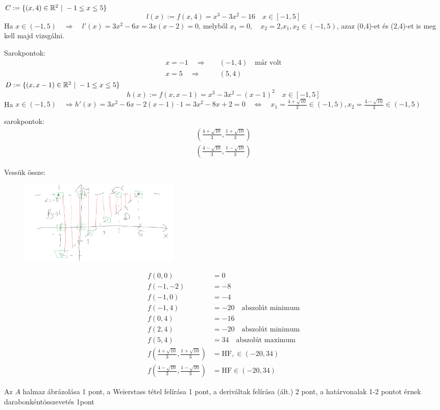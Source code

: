 \documentclass[a4paper,11.5pt]{article}
\begin{document}
\begin{task}
		$C:=\{ (x,4)\in\mathbb{R}^2\ | \ -1\leq x\leq 5 \}$
		\[ l(x):=f(x,4)=x^3-3x^2-16\quad x\in[-1,5] \]
		Ha $x\in(-1,5)\quad \Rightarrow\quad l'(x)=3x^2-6x=3x(x-2)=0$, melyből $x_1=0,\quad x_2=2$,\quad $x_1,x_2\in(-1,5)$, azaz (0,4)-et és (2,4)-et is meg kell majd vizsgálni.
		
		Sarokpontok:
		\begin{align*}
			x=-1\quad \Rightarrow&\quad (-1,4)\quad \text{már volt}\\
			x = 5\quad \Rightarrow&\quad (5,4)
		\end{align*}
		$D:=\{ (x,x-1)\in\mathbb{R}^2\ | \ -1\leq x\leq 5 \}$
		\[ h(x):=f(x,x-1)=x^3-3x^2-(x-1)^2\quad x\in[-1,5] \]
		Ha $x\in(-1,5)\quad \Rightarrow h'(x)=3x^2-6x-2(x-1)\cdot1=3x^2-8x+2=0\quad \Leftrightarrow\quad x_1=\frac{4+\sqrt{10}}{3}\in(-1,5), x_2=\frac{4-\sqrt{10}}{3}\in(-1,5)$
		
		sarokpontok:
		\begin{align*}
			\left(\frac{4+\sqrt{10}}{3},\frac{1+\sqrt{10}}{3}\right)\\
			\left(\frac{4-\sqrt{10}}{3},\frac{1-\sqrt{10}}{3}\right)
		\end{align*}
		
		Vessük össze:
		\begin{figure}[H]
			\centering
			\includegraphics[height=4cm]{../2zh/kepek/51.png}
			\caption{}
		\end{figure}
		\begin{align*}
			f(0,0)&=0\\
			f(-1,-2)&=-8\\
			f(-1,0)&=-4\\
			f(-1,4)&=-20\quad \text{abszolút minimum}\\
			f(0,4)&=-16\\
			f(2,4)&=-20\quad \text{abszolút minimum}\\
			f(5,4)&=34\quad \text{abszolút maximum}\\
			f\left(\frac{4+\sqrt{10}}{3},\frac{1+\sqrt{10}}{3}\right)&=\text{HF}, \in(-20,34)\\
			f\left(\frac{4-\sqrt{10}}{3},\frac{1-\sqrt{10}}{3}\right)&=\text{HF} \in(-20, 34)
		\end{align*}
	\end{task}
	\begin{note}
		Az $A$ halmaz ábrázolása 1 pont, a Weierstass tétel felírása 1 pont, a deriváltak felírása (ált.) 2 pont, a határvonalak 1-2 pontot érnek darabonkéntösszevetés 1pont
	\end{note}
\end{document}
